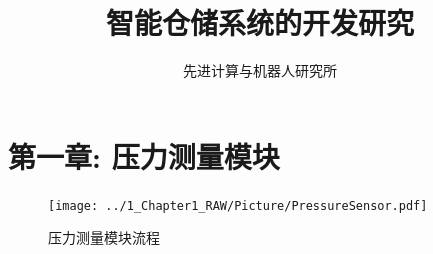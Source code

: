 \documentclass{article}
\newcommand{\xiaosihao}{\fontsize{12pt}{\baselineskip}\selectfont}
\begin{document}
	
\newtheorem{example}{例}             %
\newtheorem{algorithm}{算法}
\newtheorem{theorem}{定理}[section]  %
\newtheorem{definition}{定义}
\newtheorem{axiom}{公理}
\newtheorem{property}{性质}
\newtheorem{proposition}{命题}
\newtheorem{lemma}{引理}
\newtheorem{corollary}{推论}
\newtheorem{remark}{注解}
\newtheorem{condition}{条件}
\newtheorem{conclusion}{结论}
\newtheorem{assumption}{假设}

\renewcommand{\contentsname}{目录}  %
\renewcommand{\abstractname}{摘要}  %
\renewcommand{\refname}{参考文献}   %
\renewcommand{\indexname}{索引}
\renewcommand{\figurename}{图}
\renewcommand{\tablename}{表}
\renewcommand{\appendixname}{附录}
\renewcommand{\algorithm}{算法}	

\title{智能仓储系统的开发研究}
\author{\xiaosihao 先进计算与机器人研究所}
		
\maketitle
		
\tableofcontents
\newpage

\section{第一章: 压力测量模块}

\begin{figure}[h]
	\centering
	\texttt{[image: ../1\_Chapter1\_RAW/Picture/PressureSensor.pdf]}
	\caption{压力测量模块流程}
	\label{fig:压力测量模块流程图}
	\hfill
\end{figure}
		
\end{document}
